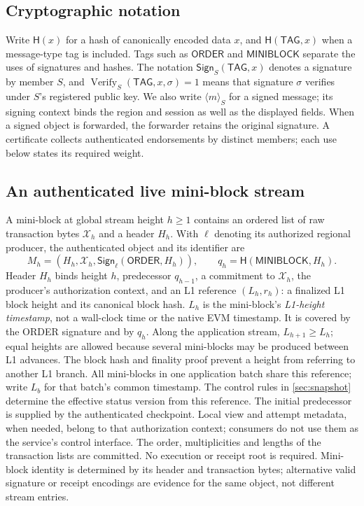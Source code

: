 \documentclass[11pt,a4paper,onecolumn]{article}
\newcommand{\Hash}{\mathsf H}
\newcommand{\Sig}{\mathsf{Sign}}
\newcommand{\Tag}[1]{\ensuremath{\mathsf{#1}}}
\begin{document}
\subsection{Cryptographic notation}
Write $\Hash(x)$ for a hash of canonically encoded data $x$, and
$\Hash(\Tag{TAG},x)$ when a message-type tag is included.
Tags such as \Tag{ORDER} and \Tag{MINIBLOCK}
separate the uses of signatures and hashes. The notation
$\Sig_S(\Tag{TAG},x)$ denotes a signature by member $S$, and
$\operatorname{Verify}_S(\Tag{TAG},x,\sigma)=1$ means that signature
$\sigma$ verifies under $S$'s registered public key. We also write
$\langle m\rangle_S$ for a signed message; its signing context binds
the region and session as well as the displayed fields.
When a signed object is forwarded, the forwarder retains the original
signature. A certificate collects authenticated endorsements by distinct
members; each use below states its required weight.

\subsection{An authenticated live mini-block stream}\label{sec:stream}
A mini-block at global stream height $h\geq1$ contains an ordered list of
raw transaction bytes $\mathcal X_h$ and a header $H_h$. With $\ell$ denoting
its authorized regional producer, the authenticated object and its
identifier are
\[
 M_h=(H_h,\mathcal X_h,\Sig_\ell(\Tag{ORDER},H_h)),
 \qquad q_h=\Hash(\Tag{MINIBLOCK},H_h).
\]
Header $H_h$ binds height $h$, predecessor $q_{h-1}$, a commitment to
$\mathcal X_h$, the producer's authorization context, and an L1 reference
$(L_h,r_h)$: a finalized L1 block height and its canonical block hash.
$L_h$ is the mini-block's \emph{L1-height timestamp}, not a wall-clock time
or the native EVM timestamp. It is covered by the ORDER signature and by
$q_h$. Along the application stream, $L_{h+1}\geq L_h$; equal heights are
allowed because several mini-blocks may be produced between L1 advances.
The block hash and finality proof prevent a height from referring to
another L1 branch. All mini-blocks in one application batch share this
reference; write $L_b$ for that batch's common timestamp.
The control rules in \cref{sec:snapshot} determine the effective status
version from this reference. The initial predecessor is supplied by
the authenticated checkpoint. Local view and attempt metadata, when needed,
belong to that authorization context; consumers do not use them as the
service's control interface. The order, multiplicities and lengths of the
transaction lists are committed. No execution or receipt root is required.
Mini-block identity is determined by its header and transaction bytes;
alternative valid signature or receipt encodings are evidence for the same
object, not different stream entries.
\end{document}
